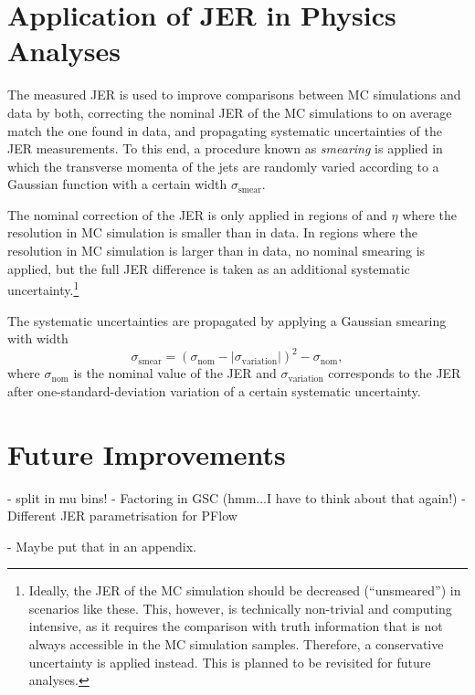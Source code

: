 \section{Application of JER in Physics Analyses}
The measured JER is used to improve comparisons between MC simulations and data by both, correcting the nominal JER of the MC simulations to on average match the one found in data, and propagating systematic uncertainties of the JER measurements.
To this end, a procedure known as \emph{smearing} is applied in which the transverse momenta of the jets are randomly varied according to a Gaussian function with a certain width $\sigma_{\text{smear}}$.

The nominal correction of the JER is only applied in regions of \pT and $\eta$ where the resolution in MC simulation is smaller than in data. In regions where the resolution in MC simulation is larger than in data, no nominal smearing is applied, but the full JER difference is taken as an additional systematic uncertainty.\footnote{Ideally, the JER of the MC simulation should be decreased (``unsmeared'') in scenarios like these. This, however, is technically non-trivial and computing intensive, as it requires the comparison with truth information that is not always accessible in the MC simulation samples. Therefore, a conservative uncertainty is applied instead. This is planned to be revisited for future analyses.}

The systematic uncertainties are propagated by applying a Gaussian smearing with width
\begin{equation}
    \sigma_{\text{smear}} =  \left( \sigma_{\text{nom}} - |\sigma_{\text{variation}}|   \right)^2  - \sigma_{\text{nom}},
\end{equation}
where $\sigma_{\text{nom}}$ is the nominal value of the JER and $\sigma_{\text{variation}}$ corresponds to the JER after one-standard-deviation variation of a certain systematic uncertainty.





\section{Future Improvements}

- split in mu bins!
- Factoring in GSC (hmm...I have to think about that again!)
- Different JER parametrisation for PFlow


- Maybe put that in an appendix.